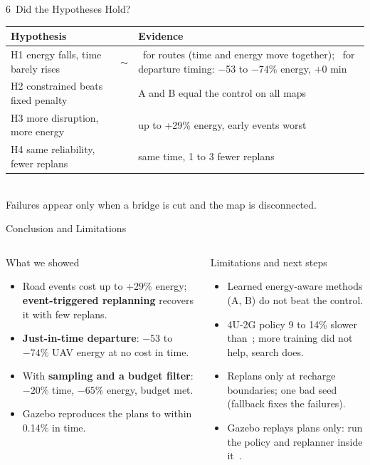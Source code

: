 \documentclass[aspectratio=169,10pt]{beamer}
\newcommand{\cmark}{\textcolor{green!50!black}{\ding{51}}}
\newcommand{\xmark}{\textcolor{red!70!black}{\ding{55}}}
\newcommand{\pmark}{\textcolor{orange!85!black}{$\sim$}}
\begin{document}
\begin{frame}{6 \,Did the Hypotheses Hold?}
\centering\small
\renewcommand{\arraystretch}{1.5}
\begin{tabular}{@{}P{5.8cm}cP{5.4cm}@{}}
\toprule
\textbf{Hypothesis} & & \textbf{Evidence}\\
\midrule
H1 energy falls, time barely rises & \pmark & \xmark\ for routes (time and energy move together); \cmark\ for departure timing: $-$53 to $-$74\% energy, $+0$ min\\
H2 constrained beats fixed penalty & \xmark & A and B equal the control on all maps\\
H3 more disruption, more energy & \cmark & up to +29\% energy, early events worst\\
H4 same reliability, fewer replans & \cmark & same time, 1 to 3 fewer replans\\
\bottomrule
\end{tabular}\\[3mm]
{\small Failures appear only when a bridge is cut and the map is disconnected.}
\end{frame}

\begin{frame}{Conclusion and Limitations}
\begin{columns}[T,onlytextwidth]
\begin{column}{0.49\textwidth}
\begin{block}{What we showed}
\small
\begin{itemize}\setlength\itemsep{1.5mm}
\item Road events cost up to $+29\%$ energy; \textbf{event-triggered replanning} recovers it with few replans.
\item \textbf{Just-in-time departure}: $-53$ to $-74\%$ UAV energy at no cost in time.
\item With \textbf{sampling and a budget filter}: $-20\%$ time, $-65\%$ energy, budget met.
\item Gazebo reproduces the plans to within 0.14\% in time.
\end{itemize}
\end{block}
\end{column}
\begin{column}{0.49\textwidth}
\begin{block}{Limitations and next steps}
\small
\begin{itemize}\setlength\itemsep{1.5mm}
\item Learned energy-aware methods (A, B) do not beat the control.
\item 4U-2G policy 9 to 14\% slower than~\cite{base}; more training did not help, search does.
\item Replans only at recharge boundaries; one bad seed (fallback fixes the failures).
\item Gazebo replays plans only: run the policy and replanner inside it~\cite{gazebo}.
\end{itemize}
\end{block}
\end{column}
\end{columns}
\end{frame}
\end{document}
